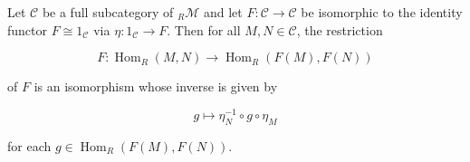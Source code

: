 Let $\mathcal{C}$ be a full subcategory of ${}_R\mathcal{M}$ and let $F: \mathcal{C} \to \mathcal{C}$ be isomorphic to the identity functor $F \cong 1_{\mathcal{C}}$ via $\eta: 1_{\mathcal{C}} \to F$. Then for all $M, N \in \mathcal{C}$, the restriction

$$F: \operatorname{Hom}_R(M, N) \to \operatorname{Hom}_R(F(M), F(N))$$

of $F$ is an isomorphism whose inverse is given by

$$g \mapsto \eta_N^{-1} \circ g \circ \eta_M$$

for each $g \in \operatorname{Hom}_R(F(M), F(N))$.
